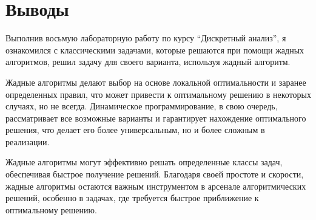 \section{Выводы}

Выполнив восьмую лабораторную работу по курсу \enquote{Дискретный анализ}, 
я ознакомился с классическими задачами, которые решаются при помощи жадных алгоритмов, решил задачу для своего варианта, используя
жадный алгоритм.

Жадные алгоритмы делают выбор на основе локальной оптимальности и заранее определенных правил, 
что может привести к оптимальному решению в некоторых случаях, но не всегда. Динамическое программирование, в свою очередь, 
рассматривает все возможные варианты и гарантирует нахождение оптимального решения, что делает его более универсальным, 
но и более сложным в реализации.

Жадные алгоритмы могут эффективно решать определенные классы задач, обеспечивая быстрое получение решений. 
Благодаря своей простоте и скорости, жадные алгоритмы остаются важным инструментом в арсенале алгоритмических решений, 
особенно в задачах, где требуется быстрое приближение к оптимальному решению.

\pagebreak